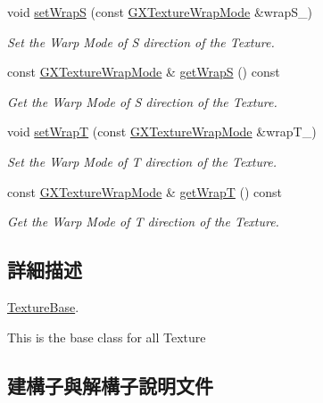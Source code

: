 \begin{DoxyCompactItemize}
void \hyperlink{class_i_dream_sky_1_1_texture_base_a40f574577388529dd629ec79bc88f647}{set\+WrapS} (const \hyperlink{class_i_dream_sky_1_1_g_x_texture_wrap_mode}{G\+X\+Texture\+Wrap\+Mode} \&wrap\+S\+\_\+)
\begin{DoxyCompactList}\small\item\em Set the Warp Mode of S direction of the Texture. \end{DoxyCompactList}\item 
const \hyperlink{class_i_dream_sky_1_1_g_x_texture_wrap_mode}{G\+X\+Texture\+Wrap\+Mode} \& \hyperlink{class_i_dream_sky_1_1_texture_base_a1becd0fa36754b6880b7dcd25742dec8}{get\+WrapS} () const 
\begin{DoxyCompactList}\small\item\em Get the Warp Mode of S direction of the Texture. \end{DoxyCompactList}\item 
void \hyperlink{class_i_dream_sky_1_1_texture_base_ac77a15bd968e31754b5d34fd7a7385e9}{set\+WrapT} (const \hyperlink{class_i_dream_sky_1_1_g_x_texture_wrap_mode}{G\+X\+Texture\+Wrap\+Mode} \&wrap\+T\+\_\+)
\begin{DoxyCompactList}\small\item\em Set the Warp Mode of T direction of the Texture. \end{DoxyCompactList}\item 
const \hyperlink{class_i_dream_sky_1_1_g_x_texture_wrap_mode}{G\+X\+Texture\+Wrap\+Mode} \& \hyperlink{class_i_dream_sky_1_1_texture_base_a97d035f34c47bcd49b9948eecb4e1861}{get\+WrapT} () const 
\begin{DoxyCompactList}\small\item\em Get the Warp Mode of T direction of the Texture. \end{DoxyCompactList}\end{DoxyCompactItemize}


\subsection{詳細描述}
\hyperlink{class_i_dream_sky_1_1_texture_base}{Texture\+Base}. 

This is the base class for all Texture 

\subsection{建構子與解構子說明文件}
